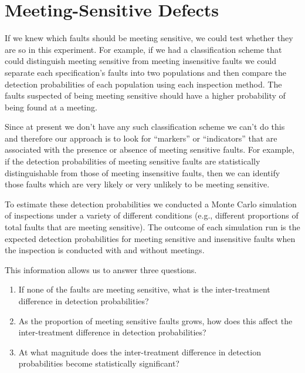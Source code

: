 \section{Meeting-Sensitive Defects}

If we knew which faults should be meeting sensitive, we could test 
whether they are so in this experiment. For example, if we had  
a classification scheme that could distinguish meeting sensitive 
from meeting insensitive faults we could 
separate each specification's faults into two 
populations and then compare the detection 
probabilities of each population using each inspection method.
The faults suspected of being meeting sensitive should have a higher
probability of being found at a meeting.

Since at present we don't have any such classification scheme
we can't do this and therefore our approach is to look
for ``markers'' or ``indicators'' that are associated with the
presence or absence of meeting sensitive faults.
For example, if the detection probabilities of meeting sensitive 
faults are statistically distinguishable from
those of meeting insensitive faults, then we can identify 
those faults which are very likely or very unlikely to be
meeting sensitive.  

To estimate these detection probabilities we conducted a
Monte Carlo simulation of inspections under a variety of 
different conditions (e.g., different proportions of 
total faults that are meeting sensitive). The outcome of each 
simulation run is the expected detection probabilities for meeting
sensitive and insensitive faults when the inspection is conducted 
with and without meetings.  

This information allows us to answer three questions.

\begin{enumerate}

\item If none of the faults are meeting sensitive, what is the 
inter-treatment difference in detection probabilities?

\item As the proportion of meeting sensitive faults grows, how
does this affect the inter-treatment difference in detection probabilities?

\item At what magnitude does the inter-treatment difference 
in detection probabilities become statistically significant?

\end{enumerate}

